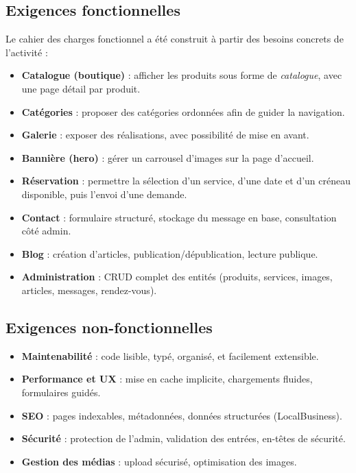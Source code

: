 \subsection{Exigences fonctionnelles}
Le cahier des charges fonctionnel a été construit à partir des besoins concrets de l’activité :
\begin{itemize}
    \item \textbf{Catalogue (boutique)} : afficher les produits sous forme de \textit{catalogue}, avec une page détail par produit.
    \item \textbf{Catégories} : proposer des catégories ordonnées afin de guider la navigation.
    \item \textbf{Galerie} : exposer des réalisations, avec possibilité de mise en avant.
    \item \textbf{Bannière (hero)} : gérer un carrousel d’images sur la page d’accueil.
    \item \textbf{Réservation} : permettre la sélection d’un service, d’une date et d’un créneau disponible, puis l’envoi d’une demande.
    \item \textbf{Contact} : formulaire structuré, stockage du message en base, consultation côté admin.
    \item \textbf{Blog} : création d’articles, publication/dépublication, lecture publique.
    \item \textbf{Administration} : CRUD complet des entités (produits, services, images, articles, messages, rendez-vous).
\end{itemize}

\subsection{Exigences non-fonctionnelles}
\begin{itemize}
    \item \textbf{Maintenabilité} : code lisible, typé, organisé, et facilement extensible.
    \item \textbf{Performance et UX} : mise en cache implicite, chargements fluides, formulaires guidés.
    \item \textbf{SEO} : pages indexables, métadonnées, données structurées (LocalBusiness).
    \item \textbf{Sécurité} : protection de l’admin, validation des entrées, en-têtes de sécurité.
    \item \textbf{Gestion des médias} : upload sécurisé, optimisation des images.
\end{itemize}


